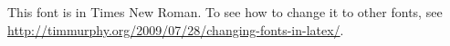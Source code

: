 \documentclass{article}
\begin{document}
This font is in Times New Roman. To see how to change it to other fonts, see
\url{http://timmurphy.org/2009/07/28/changing-fonts-in-latex/}.
\end{document}
